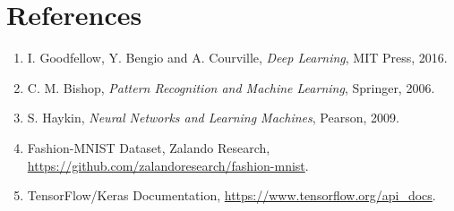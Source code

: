 \documentclass[11pt]{article}
\begin{document}
\section{References}
\begin{enumerate}
    \item I. Goodfellow, Y. Bengio and A. Courville, \textit{Deep Learning}, MIT Press, 2016.
    \item C. M. Bishop, \textit{Pattern Recognition and Machine Learning}, Springer, 2006.
    \item S. Haykin, \textit{Neural Networks and Learning Machines}, Pearson, 2009.
    \item Fashion-MNIST Dataset, Zalando Research, \url{https://github.com/zalandoresearch/fashion-mnist}.
    \item TensorFlow/Keras Documentation, \url{https://www.tensorflow.org/api_docs}.
\end{enumerate}
\end{document}
